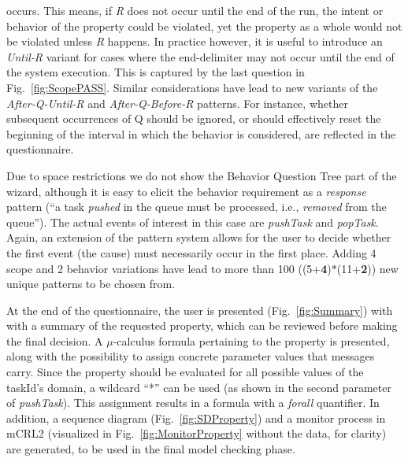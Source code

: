 \documentclass[letter]{llncs}
\begin{document}
occurs. This means, if \emph{R} does not occur until the end of the run, the intent or behavior 
of the property could be violated, yet the property as a whole would not be violated 
unless \emph{R} happens. In practice however, it is useful to introduce an \emph{Until-R} variant for cases where the end-delimiter may not occur until the end of 
the system execution. This is captured by the last question in Fig.~\ref{fig:ScopePASS}.
Similar considerations have lead to new variants of the \emph{After-Q-Until-R} and \emph{After-Q-Before-R} patterns.
For instance, whether subsequent occurrences of Q should be ignored, or should effectively reset the beginning of the interval
in which the behavior is considered, are reflected in the questionnaire.

Due to space restrictions we do not show the Behavior Question Tree part of the wizard, although it is easy to
elicit the behavior requirement as a \emph{response} pattern (``a task \emph{pushed} in the queue must be processed, i.e., \emph{removed} from the queue'').
The actual events of interest in this case are \emph{pushTask} and \emph{popTask}. Again, an extension of the pattern system allows
for the user to decide whether the first event (the cause) must necessarily occur in the first place. 
Adding 4 scope and 2 behavior variations have lead to more than 100 ((5+\textbf{4})$\ast$(11+\textbf{2})) new unique patterns to be chosen from. 

At the end of the questionnaire, the user is presented (Fig.~\ref{fig:Summary}) with with a summary of the requested property, which can be reviewed before making the final decision.
A $\mu$-calculus formula pertaining to the property is presented, along with the possibility to assign concrete parameter values that messages carry. 
Since the property should be evaluated for all possible values of the taskId's domain, a wildcard ``*'' can be used (as shown in the second parameter of \emph{pushTask}).
This assignment results in a formula with a \emph{forall} quantifier. In addition, a sequence diagram (Fig.~\ref{fig:SDProperty}) and a monitor process in mCRL2 (visualized in Fig.~\ref{fig:MonitorProperty} without the data, for clarity)  
are generated, to be used in the final model checking phase.
\end{document}

